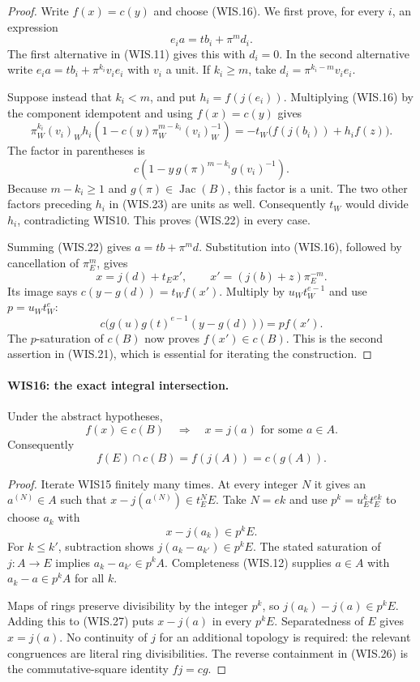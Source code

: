\begin{proof}
Write $f(x)=c(y)$ and choose (WIS.16).
We first prove, for every $i$, an expression
\[
                         e_i a=tb_i+\pi^md_i.             \tag{WIS.22}
\]
The first alternative in (WIS.11) gives this with $d_i=0$.
In the second alternative write
$e_i a=tb_i+\pi^{k_i}v_i e_i$ with $v_i$ a unit.
If $k_i\geq m$, take $d_i=\pi^{k_i-m}v_i e_i$.

Suppose instead that $k_i<m$, and put $h_i=f(j(e_i))$.
Multiplying (WIS.16) by the component idempotent and
using $f(x)=c(y)$ gives
\[
 \pi_W^{k_i}(v_i)_W h_i
    \left(1-c(y)\pi_W^{m-k_i}(v_i)_W^{-1}\right)
        =-t_W\bigl(f(j(b_i))+h_i f(z)\bigr).                \tag{WIS.23}
\]
The factor in parentheses is
\[
          c\left(1-y\,g(\pi)^{m-k_i}g(v_i)^{-1}\right).
\]
Because $m-k_i\geq1$ and $g(\pi)\in\operatorname{Jac}(B)$,
this factor is a unit. The two other factors preceding
$h_i$ in (WIS.23) are units as well. Consequently $t_W$
would divide $h_i$, contradicting WIS10. This proves
(WIS.22) in every case.

Summing (WIS.22) gives $a=tb+\pi^md$.
Substitution into (WIS.16), followed by cancellation
of $\pi_E^m$, gives
\[
         x=j(d)+t_Ex',\qquad
         x'=(j(b)+z)\pi_E^{-m}.                            \tag{WIS.24}
\]
Its image says $c(y-g(d))=t_W f(x')$. Multiply by
$u_Wt_W^{e-1}$ and use $p=u_Wt_W^e$:
\[
       c\bigl(g(u)g(t)^{e-1}(y-g(d))\bigr)=p f(x').
\]
The $p$-saturation of $c(B)$ now proves $f(x')\in c(B)$.
This is the second assertion in (WIS.21), which is
essential for iterating the construction.
\end{proof}

\paragraph{WIS16: the exact integral intersection.}
\label{claim:WIS16}
Under the abstract hypotheses,
\[
             f(x)\in c(B)\quad\Longrightarrow\quad
                          x=j(a)\text{ for some }a\in A. \tag{WIS.25}
\]
Consequently
\[
                       f(E)\cap c(B)=f(j(A))=c(g(A)).     \tag{WIS.26}
\]

\begin{proof}
Iterate WIS15 finitely many times. At every integer $N$
it gives an $a^{(N)}\in A$ such that
$x-j(a^{(N)})\in t_E^NE$. Take $N=ek$ and use
$p^k=u_E^kt_E^{ek}$ to choose $a_k$ with
\[
                         x-j(a_k)\in p^kE.               \tag{WIS.27}
\]
For $k\leq k'$, subtraction shows
$j(a_k-a_{k'})\in p^kE$. The stated saturation of
$j:A\to E$ implies $a_k-a_{k'}\in p^kA$.
Completeness (WIS.12) supplies $a\in A$ with
$a_k-a\in p^kA$ for all $k$.

Maps of rings preserve divisibility by the integer $p^k$,
so $j(a_k)-j(a)\in p^kE$. Adding this to (WIS.27)
puts $x-j(a)$ in every $p^kE$. Separatedness of $E$
gives $x=j(a)$.
No continuity of $j$ for an additional topology is
required: the relevant congruences are literal ring
divisibilities. The reverse containment in (WIS.26)
is the commutative-square identity $fj=cg$.
\end{proof}

